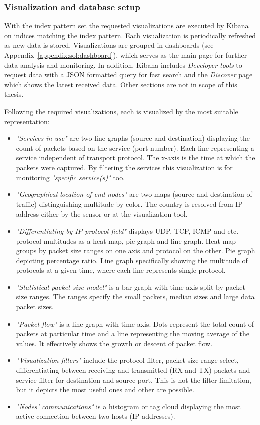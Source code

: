 \documentclass[12pt,a4paper,twoside]{report}
\begin{document}
			\subsubsection*{Visualization and database setup} \label{sol:design:elk:vis}
				With the index pattern set the requested visualizations are executed by Kibana on indices matching the index pattern. Each  visualization is periodically refreshed as new data is stored. Visualizations are grouped in dashboards (see Appendix~\ref{appendix:sol:dashboard}), which serves as the main page for further data analysis and monitoring. In addition, Kibana includes \emph{Developer tools} to request data with a JSON formatted query for fast search and the \emph{Discover} page which shows the latest received data. Other sections are not in scope of this thesis.\par
				Following the required visualizations, each is visualized by the most suitable representation:
				\begin{itemize}
					\item \emph{"Services in use"} are two line graphs (source and destination) displaying the count of packets based on the service (port number). Each line representing a service independent of transport protocol. The x-axis is the time at which the packets were captured. By filtering the services this visualization is for monitoring \emph{"specific service(s)"} too.
					\item \emph{"Geographical location of end nodes"} are two maps (source and destination of traffic) distinguishing multitude by color. The country is resolved from IP address either by the sensor or at the visualization tool.
					\item \emph{"Differentiating by IP protocol field"} displays UDP, TCP, ICMP and etc. protocol multitudes as a heat map, pie graph and line graph. Heat map groups by packet size ranges on one axis and protocol on the other. Pie graph depicting percentage ratio. Line graph specifically showing the multitude of protocols at a given time, where each line represents single protocol.
					\item \emph{"Statistical packet size model"} is a bar graph with time axis split by packet size ranges. The ranges specify the small packets, median sizes and large data packet sizes.
					\item \emph{"Packet flow"} is a line graph with time axis. Dots represent the total count of packets at particular time and a line representing the moving average of the values. It effectively shows the growth or descent of packet flow.
					\item \emph{"Visualization filters"} include the protocol filter, packet size range select, differentiating between receiving and transmitted (RX and TX) packets and service filter for destination and source port. This is not the filter limitation, but it depicts the most useful ones and other are possible.
					\item \emph{"Nodes' communications"} is a histogram or tag cloud displaying the most active connection between two hosts (IP addresses). 
				\end{itemize}
				
\end{document}
